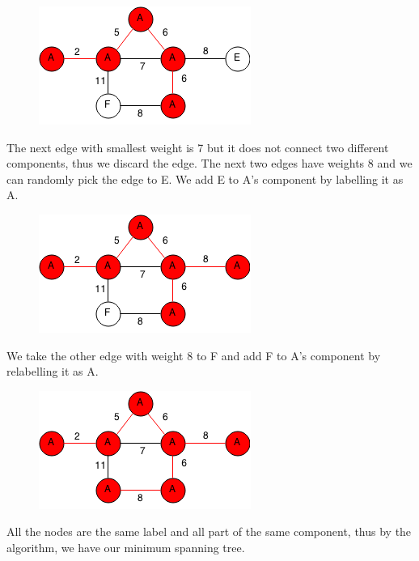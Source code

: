 \documentclass[11pt,oneside]{book}
\makeatletter
\def\maxwidth#1{\ifdim\Gin@nat@width>#1 #1\else\Gin@nat@width\fi}
\makeatother
\begin{document}
\vspace{5px}\begin{figure}[H]\centering
        \includegraphics[width=0.66\maxwidth{\textwidth}]{kruskal5.png}
        \end{figure}

The next edge with smallest weight is 7 but it does not connect two different components, thus we discard the edge. The next two edges have weights 8 and we can randomly pick the edge to E. We add E to A's component by labelling it as A.

\vspace{5px}\begin{figure}[H]\centering
        \includegraphics[width=0.66\maxwidth{\textwidth}]{kruskal6.png}
        \end{figure}

We take the other edge with weight 8 to F and add F to A's component by relabelling it as A.

\vspace{5px}\begin{figure}[H]\centering
        \includegraphics[width=0.66\maxwidth{\textwidth}]{kruskal7.png}
        \end{figure}

All the nodes are the same label and all part of the same component, thus by the algorithm, we have our minimum spanning tree.
\end{document}
